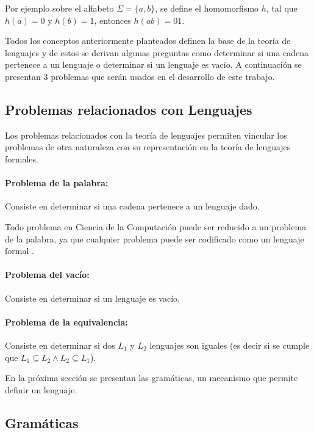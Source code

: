 \documentclass[12pt]{article}
\begin{document}
Por ejemplo sobre el alfabeto $\Sigma=\{a,b\}$, se define el homomorfismo $h$, tal que $h(a)=0$ y $h(b)=1$, entonces
$h(ab)=01$.

Todos los conceptos anteriormente planteados definen la base de la teoría de lenguajes y de estos se derivan algunas 
preguntas como determinar si una cadena pertenece a un lenguaje o determinar si un lenguaje es vacío. A continuación se presentan 3 problemas que serán usados en el desarrollo de este trabajo.

\subsection{Problemas relacionados con Lenguajes}

Los problemas relacionados con la teoría de lenguajes permiten vincular los problemas de otra naturaleza 
con su representación en la teoría de lenguajes formales. 

\paragraph{Problema de la palabra:} Consiste en determinar si una cadena pertenece a un lenguaje dado.

Todo problema en Ciencia de la Computación puede ser reducido a un problema de la palabra, ya que cualquier problema
puede ser codificado como un lenguaje formal \cite{authomataTheory}.

\paragraph{Problema del vacío:} Consiste en determinar si un lenguaje es vacío. 

\paragraph{Problema de la equivalencia:} Consiste en determinar si dos $L_1$ y $L_2$ lenguajes son iguales (es decir si se cumple que
$L_1\subseteq L_2 \wedge L_2\subseteq L_1$).

En la próxima sección se presentan las gramáticas, un mecanismo que permite definir un lenguaje.

\subsection{Gramáticas}
\end{document}
